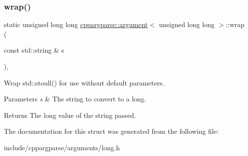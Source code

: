 \subsubsection{\texorpdfstring{wrap()}{wrap()}}
{\footnotesize\ttfamily static unsigned long long \hyperlink{structcppargparse_1_1argument}{cppargparse\+::argument}$<$ unsigned long long $>$\+::wrap (\begin{DoxyParamCaption}\item[{const std\+::string \&}]{s }\end{DoxyParamCaption})\hspace{0.3cm}{\ttfamily [inline]}, {\ttfamily [static]}}



Wrap std\+::stoull() for use without default parameters. 


\begin{DoxyParams}{Parameters}
{\em s} & The string to convert to a long.\\
\hline
\end{DoxyParams}
\begin{DoxyReturn}{Returns}
The long value of the string passed. 
\end{DoxyReturn}


The documentation for this struct was generated from the following file\+:\begin{DoxyCompactItemize}
\item 
include/cppargparse/arguments/long.\+h\end{DoxyCompactItemize}
